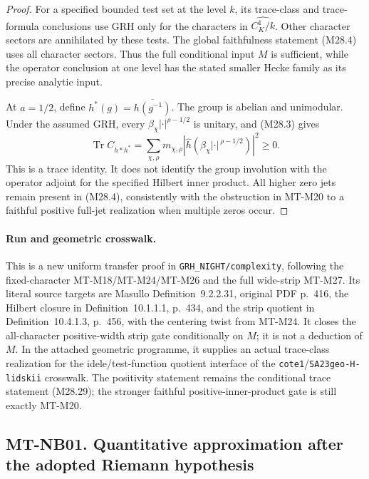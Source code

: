 \begin{proof}
For a specified bounded test set
at the level \(k\), its trace-class
and trace-formula conclusions use
GRH only for the characters in
\(\widehat{C_K^1/k}\). Other
character sectors are annihilated
by these tests. The global
faithfulness statement (M28.4)
uses all character sectors.
Thus the full conditional input
\(M\) is sufficient, while the
operator conclusion at one level
has the stated smaller Hecke
family as its precise analytic
input.

At \(a=1/2\), define
\(h^*(g)=\overline{h(g^{-1})}\).
The group is abelian and
unimodular. Under the assumed
GRH, every
\(\beta_\chi|\cdot|^{\rho-1/2}\)
is unitary, and (M28.3) gives
\[
       \operatorname{Tr} C_{h*h^*}
          =\sum_{\chi,\rho}
                 m_{\chi,\rho}
                 |\widehat h(
                    \beta_\chi|\cdot|^{\,\rho-1/2})|^2
          \ge0.                                               \tag{M28.29}
\]
This is a trace identity. It
does not identify the group
involution with the operator
adjoint for the specified
Hilbert inner product.
All higher zero jets remain
present in (M28.4), consistently
with the obstruction in MT-M20
to a faithful positive
full-jet realization when
multiple zeros occur.
\end{proof}

\paragraph{Run and geometric crosswalk.}
This is a new uniform transfer proof in
\texttt{GRH\_NIGHT/complexity}, following the fixed-character
MT-M18/MT-M24/MT-M26 and the full wide-strip MT-M27.
Its literal source targets are Masullo
Definition~9.2.2.31, original PDF p.~416, the Hilbert
closure in Definition~10.1.1.1, p.~434, and the
strip quotient in Definition~10.4.1.3, p.~456,
with the centering twist from MT-M24. It closes
the all-character positive-width strip gate
conditionally on \(M\); it is not a deduction
of \(M\). In the attached geometric programme,
it supplies an actual trace-class realization
for the idele/test-function quotient interface
of the \texttt{cote1}/\texttt{SA23geo-H-lidskii}
crosswalk. The positivity statement remains
the conditional trace statement (M28.29);
the stronger faithful positive-inner-product
gate is still exactly MT-M20.

\subsection*{MT-NB01. Quantitative approximation after the adopted Riemann hypothesis}

